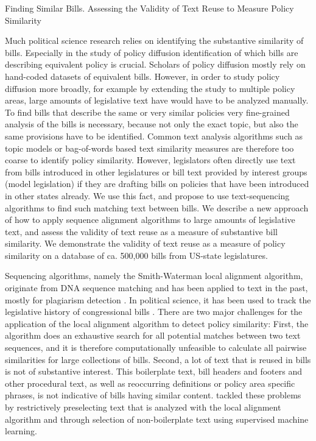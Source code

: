 \documentclass[12pt]{article} %
\begin{document}
 

\begin{center}
    \begin{Large}
    Finding Similar Bills. Assessing the Validity of Text Reuse to Measure Policy Similarity 
    \end{Large}

\end{center}

Much political science research relies on identifying the substantive similarity of bills. Especially in the study of policy diffusion identification of which bills are describing equivalent policy is crucial. Scholars of policy diffusion mostly rely on hand-coded datasets of equivalent bills. However, in order to study policy diffusion more broadly, for example by extending the study to multiple policy areas, large amounts of legislative text have would have to be analyzed manually. To find bills that describe the same or very similar policies very fine-grained analysis of the bills is necessary, because not only the exact topic, but also the same provisions have to be identified. Common text analysis algorithms such as topic models or bag-of-words based text similarity measures are therefore too coarse to identify policy similarity. However, legislators often directly use text from bills introduced in other legislatures or bill text provided by interest groups (model legislation) if they are drafting bills on policies that have been introduced in other states already. We use this fact, and propose to use text-sequencing algorithms to find such matching text between bills. We describe a new approach of how to apply sequence alignment algorithms to large amounts of legislative text, and assess the validity of text reuse as a measure of substantive bill similarity. We demonstrate the validity of text reuse as a measure of policy similarity on a database of ca. 500,000 bills from US-state legislatures. 

Sequencing algorithms, namely the Smith-Waterman local alignment algorithm, originate from DNA sequence matching and has been applied to text in the past, mostly for plagiarism detection \citep{su2008plagiarism, irving2008plagiarism}. In political science, it has been used to track the legislative history of congressional bills \citep{wilkerson2015tracing}. There are two major challenges for the application of the local alignment algorithm to detect policy similarity: First, the algorithm does an exhaustive search for all potential matches between two text sequences, and it is therefore computationally unfeasible to calculate all pairwise similarities for large collections of bills. Second, a lot of text that is reused in bills is not of substantive interest. This boilerplate text, bill headers and footers and other procedural text, as well as reoccurring definitions or policy area specific phrases, is not indicative of bills having similar content. \citet{wilkerson2015tracing} tackled these problems by restrictively preselecting text that is analyzed with the local alignment algorithm and through selection of non-boilerplate text using supervised machine learning. 
\end{document}

